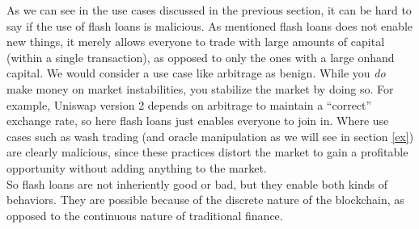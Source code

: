 As we can see in the use cases discussed in the previous section, it can be hard
to say if the use of flash loans is malicious. As mentioned flash loans does not
enable new things, it merely allows everyone to trade with large amounts of
capital (within a single transaction), as opposed to only the ones with a large
onhand capital. We would consider a use case like arbitrage as benign. While you
\textit{do} make money on market instabilities, you stabilize the market by
doing so. For example, Uniswap version 2 depends on arbitrage to maintain a
``correct'' exchange rate, so here flash loans just enables everyone to join in.
Where use cases such as wash trading (and oracle manipulation as we will see in
section \ref{ex}) are clearly malicious, since these practices distort the
market to gain a profitable opportunity without adding anything to the market.\\

So flash loans are not inheriently good or bad, but they enable both kinds of
behaviors. They are possible because of the discrete nature of the blockchain,
as opposed to the continuous nature of traditional finance.
